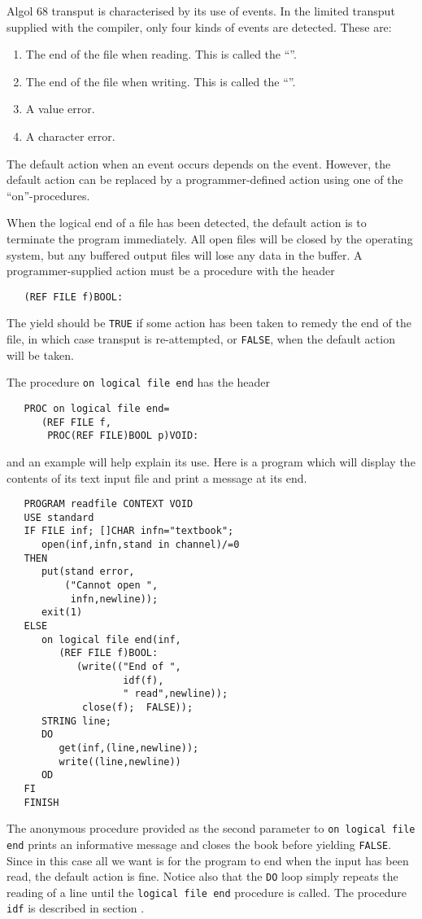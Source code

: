 Algol 68 transput is characterised by its use of events. In the
limited transput supplied with the
 compiler,
only four kinds of events are detected. These are:
\begin{enumerate}
\item The end of the file when reading. This is called the
``''.
\item The end of the file when writing. This is called the
``''.
\item A value error.
\item A character error.
\end{enumerate}
The default action when an event occurs depends on the event.
However, the default action can be replaced by a programmer-defined
action using one of the ``on''-procedures.

When the logical end of a file has been detected, the default action
is to terminate the program immediately. All open files will be
closed by the operating system, but any buffered output files will
lose any data in the buffer. A programmer-supplied action must be a
procedure with the header
\begin{verbatim}
   (REF FILE f)BOOL:
\end{verbatim}
\noindent
The yield should be \verb|TRUE| if some action has been taken to
remedy the end of the file, in which case transput is re-attempted,
or \verb|FALSE|, when the default action will be taken.

The procedure \verb|on logical file end| has the header
\begin{verbatim}
   PROC on logical file end=
      (REF FILE f,
       PROC(REF FILE)BOOL p)VOID:
\end{verbatim}
\noindent
and an example will help explain its use. Here is a program which
will display the contents of its text input file and print a message
at its end.
\begin{verbatim}
   PROGRAM readfile CONTEXT VOID
   USE standard
   IF FILE inf; []CHAR infn="textbook";
      open(inf,infn,stand in channel)/=0
   THEN
      put(stand error,
          ("Cannot open ",
           infn,newline));
      exit(1)
   ELSE
      on logical file end(inf,
         (REF FILE f)BOOL:
            (write(("End of ",
                    idf(f),
                    " read",newline));
             close(f);  FALSE));
      STRING line;
      DO
         get(inf,(line,newline));
         write((line,newline))
      OD
   FI
   FINISH
\end{verbatim}
\noindent
The anonymous procedure provided as the second parameter to
\verb|on logical file end| prints an informative message and closes
the book before yielding \verb|FALSE|. Since in this case all we want
is for the program to end when the input has been read, the default
action is fine. Notice also that the \verb|DO| loop simply repeats
the reading of a line until the \verb|logical file end| procedure is
called. The procedure \verb|idf| is described in section
.

